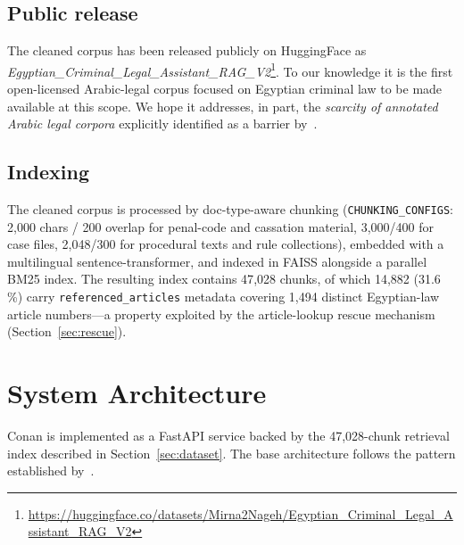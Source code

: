 \documentclass[final,1p,times]{elsarticle}
\begin{document}
\subsection{Public release}

The cleaned corpus has been released publicly on HuggingFace as
\emph{Egyptian\_Criminal\_Legal\_Assistant\_RAG\_V2}\footnote{
\url{https://huggingface.co/datasets/Mirna2Nageh/Egyptian_Criminal_Legal_Assistant_RAG_V2}
}.
To our knowledge it is the first open-licensed Arabic-legal corpus focused
on Egyptian criminal law to be made available at this scope. We hope it
addresses, in part, the \emph{scarcity of annotated Arabic legal corpora}
explicitly identified as a barrier by~\cite{hrimech2025}.

\subsection{Indexing}

The cleaned corpus is processed by doc-type-aware chunking
(\texttt{CHUNKING\_CONFIGS}: 2{,}000 chars / 200 overlap for penal-code and
cassation material, 3{,}000/400 for case files, 2{,}048/300 for procedural
texts and rule collections), embedded with a multilingual sentence-transformer,
and indexed in FAISS alongside a parallel BM25 index. The resulting index
contains 47{,}028 chunks, of which 14{,}882 (31.6\,\%) carry
\texttt{referenced\_articles} metadata covering 1{,}494 distinct Egyptian-law
article numbers---a property exploited by the article-lookup rescue
mechanism (Section~\ref{sec:rescue}).

\section{System Architecture}\label{sec:arch}

Conan is implemented as a FastAPI service backed by the 47{,}028-chunk
retrieval index described in Section~\ref{sec:dataset}. The base architecture
follows the pattern established by~\cite{elbeltagy2024,hrimech2025,alghamdi2023}.
\end{document}
